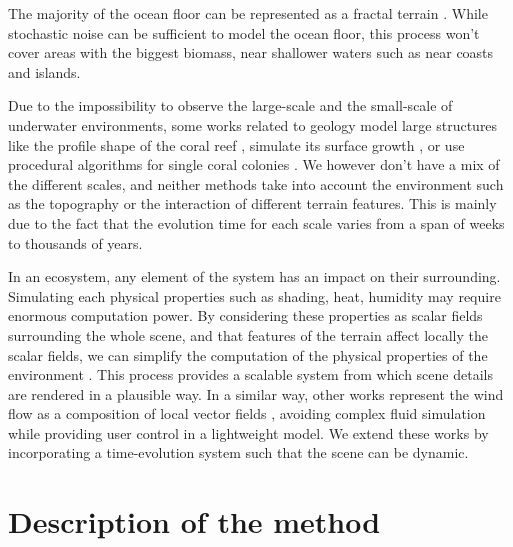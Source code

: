 The majority of the ocean floor can be represented as a fractal terrain \cite{Mareschal1989}. While stochastic noise can be sufficient to model the ocean floor, this process won't cover areas with the biggest biomass, near shallower waters such as near coasts and islands.

Due to the impossibility to observe the large-scale and the small-scale of underwater environments, some works related to geology model large structures like the profile shape of the coral reef \cite{Bosscher1992}, simulate its surface growth \cite{Li2021}, or use procedural algorithms for single coral colonies \cite{Abela2015}. We however don't have a mix of the different scales, and neither methods take into account the environment such as the topography or the interaction of different terrain features. This is mainly due to the fact that the evolution time for each scale varies from a span of weeks to thousands of years.

In an ecosystem, any element of the system has an impact on their surrounding. Simulating each physical properties such as shading, heat, humidity may require enormous computation power. By considering these properties as scalar fields surrounding the whole scene, and that features of the terrain affect locally the scalar fields, we can simplify the computation of the physical properties of the environment \cite{Grosbellet2016, Guerin2016a}. This process provides a scalable system from which scene details are rendered in a plausible way. In a similar way, other works represent the wind flow as a composition of local vector fields \cite{Wejchert1991}, avoiding complex fluid simulation while providing user control in a lightweight model. We extend these works by incorporating a time-evolution system such that the scene can be dynamic.


\section{Description of the method}
\label{sec:semantic-representation_pipeline}




